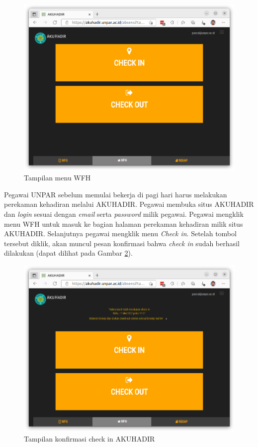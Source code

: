 \begin{figure}[H]
	\centering
	\includegraphics[scale=0.4]{Gambar/akuhadir-2-wfh.png}
	\caption{Tampilan menu WFH} 
	\label{fig:akuhadir-2-wfh}
\end{figure}
Pegawai UNPAR sebelum memulai bekerja di pagi hari harus melakukan perekaman kehadiran melalui AKUHADIR. Pegawai membuka situs AKUHADIR dan \textit{login} sesuai dengan \textit{email} serta \textit{password} milik pegawai. Pegawai mengklik menu WFH untuk masuk ke bagian halaman perekaman kehadiran milik situs AKUHADIR. Selanjutnya pegawai mengklik menu \textit{Check in}. Setelah tombol tersebut diklik, akan muncul pesan konfirmasi bahwa \textit{check in} sudah berhasil dilakukan (dapat dilihat pada Gambar \ref{fig:akuhadir-3-wfh-checkin}).

\begin{figure}[H]
	\centering
	\includegraphics[scale=0.4]{Gambar/akuhadir-3-wfh-checkin.png}
	\caption{Tampilan konfirmasi check in AKUHADIR} 
	\label{fig:akuhadir-3-wfh-checkin}
\end{figure}

